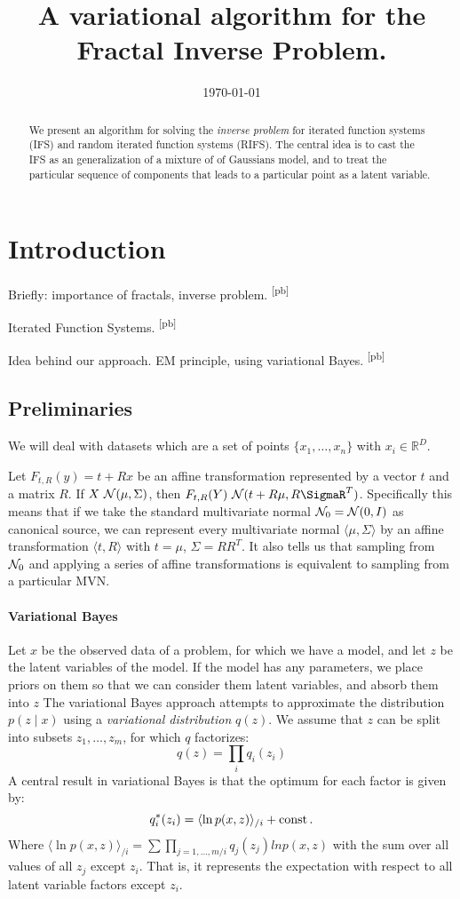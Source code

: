 \documentclass[10pt,a4paper,oneside]{article}
\title{A variational algorithm for the Fractal Inverse Problem.}
\date{\today}
\theoremstyle{definition}
\newcommand{\p}{\mbox{\,.}}
\newcommand{\cN}{{\cal N}}
\newcommand{\pb}[1]{\textcolor{OliveGreen}{\small #1 \textsuperscript{[pb]} }}
\begin{document}
\maketitle

\begin{abstract}
\noindent We present an algorithm for solving the \emph{inverse problem} for iterated function systems (IFS) and random iterated function systems (RIFS). The central idea is to cast the IFS as an generalization of a mixture of of Gaussians model, and to treat the particular sequence of components that leads to a particular point as a latent variable.
\end{abstract}
\section{Introduction}
\pb{Briefly: importance of fractals, inverse problem.}

\pb{Iterated Function Systems.}

\pb{Idea behind our approach. EM principle, using variational Bayes.}

\subsection{Preliminaries}
We will deal with datasets which are a set of points $\{x_1, \ldots, x_n\}$ with $x_i \in \mathbb{R}^D$.

Let $F_{t, R}(y) = t + Rx$ be an affine transformation represented by a vector $t$ and a matrix $R$. If $X ~ \cN(\mu, \Sigma)$, then $F_{t, R}(Y) ~ \cN(t + R\mu, R\SigmaR^T)$. Specifically this means that if we take the standard multivariate normal $\cN_0 = \cN(0, I)$ as  canonical source, we can represent every multivariate normal $\langle \mu, \Sigma \rangle$ by an affine transformation $\langle t, R \rangle$ with $t = \mu$, $\Sigma = RR^T$. It also tells us that sampling from $\cN_0$ and applying a series of affine transformations is equivalent to sampling from a particular MVN.

\paragraph{Variational Bayes} Let $x$ be the observed data of a problem, for which we have a model, and let $z$ be the latent variables of the model. If the model has any parameters, we place priors on them so that we can consider them latent variables, and absorb them into $z$ The variational Bayes approach attempts to approximate the distribution $p(z \mid x)$ using a \emph{variational distribution} $q(z)$. We assume that $z$ can be split into subsets $z_1, \ldots, z_m$, for which $q$ factorizes:
\[
q(z) = \prod_i q_i(z_i)
\]
A central result in variational Bayes is that the optimum for each factor is given by:
\begin{equation}
q^*_i(z_i) = \langle \ln p(x, z)\rangle_{/i} + \text {const} \p \label{line:var-bayes}
\end{equation}
Where $\langle \ln p(x, z) \rangle_{/i} = \sum \prod_{j = {1, \ldots, m}/i} q_j(z_j) ln p(x, z)$ with the sum over all values of all $z_j$ except $z_i$. That is, it represents the expectation with respect to all latent variable factors except $z_i$. 
\end{document}
